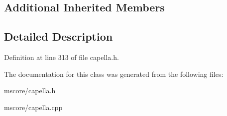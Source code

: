 \subsection*{Additional Inherited Members}


\subsection{Detailed Description}


Definition at line 313 of file capella.\+h.



The documentation for this class was generated from the following files\+:\begin{DoxyCompactItemize}
\item 
mscore/capella.\+h\item 
mscore/capella.\+cpp\end{DoxyCompactItemize}
